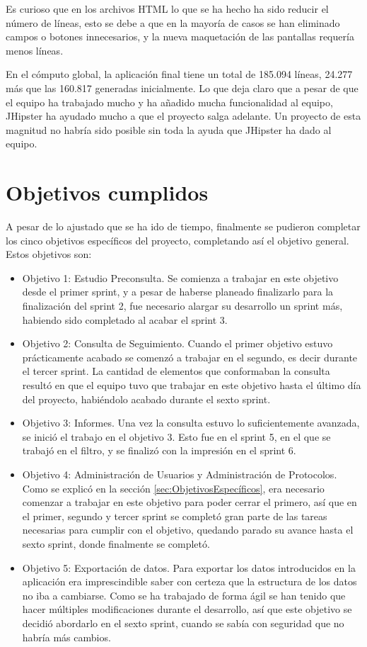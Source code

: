 Es curioso que en los archivos HTML lo que se ha hecho ha sido reducir el número de líneas, esto se debe a que en la mayoría de casos se han eliminado campos o botones innecesarios, y la nueva maquetación de las pantallas requería menos líneas.

En el cómputo global, la aplicación final tiene un total de 185.094 líneas, 24.277 más que las 160.817 generadas inicialmente. Lo que deja claro que a pesar de que el equipo ha trabajado mucho y ha añadido mucha funcionalidad al equipo, JHipster ha ayudado mucho a que el proyecto salga adelante. Un proyecto de esta magnitud no habría sido posible sin toda la ayuda que JHipster ha dado al equipo.

\section{Objetivos cumplidos}
\label{sec:objetivosCumplidos}

A pesar de lo ajustado que se ha ido de tiempo, finalmente se pudieron completar los cinco objetivos específicos del proyecto, completando así el objetivo general. Estos objetivos son:

\begin{itemize}
	\item Objetivo 1: Estudio Preconsulta. Se comienza a trabajar en este objetivo desde el primer sprint, y a pesar de haberse planeado finalizarlo para la finalización del sprint 2, fue necesario alargar su desarrollo un sprint más, habiendo sido completado al acabar el sprint 3.
	\item Objetivo 2: Consulta de Seguimiento. Cuando el primer objetivo estuvo prácticamente acabado se comenzó a trabajar en el segundo, es decir durante el tercer sprint. La cantidad de elementos que conformaban la consulta resultó en que el equipo tuvo que trabajar en este objetivo hasta el último día del proyecto, habiéndolo acabado durante el sexto sprint.
	\item Objetivo 3: Informes. Una vez la consulta estuvo lo suficientemente avanzada, se inició el trabajo en el objetivo 3. Esto fue en el sprint 5, en el que se trabajó en el filtro, y se finalizó con la impresión en el sprint 6.
	\item Objetivo 4: Administración de Usuarios y Administración de Protocolos. Como se explicó en la sección \ref{sec:ObjetivosEspecíficos}, era necesario comenzar a trabajar en este objetivo para poder cerrar el primero, así que en el primer, segundo y tercer sprint se completó gran parte de las tareas necesarias para cumplir con el objetivo, quedando parado su avance hasta el sexto sprint, donde finalmente se completó.
	\item Objetivo 5: Exportación de datos. Para exportar los datos introducidos en la aplicación era imprescindible saber con certeza que la estructura de los datos no iba a cambiarse. Como se ha trabajado de forma ágil se han tenido que hacer múltiples modificaciones durante el desarrollo, así que este objetivo se decidió abordarlo en el sexto sprint, cuando se sabía con seguridad que no habría más cambios.
\end{itemize}

